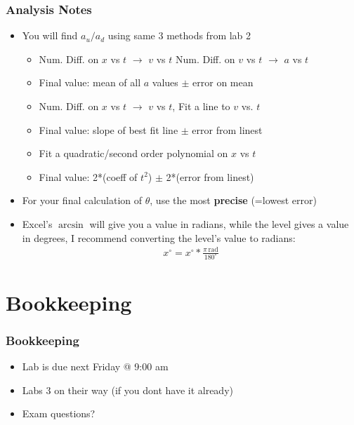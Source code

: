 \documentclass[aspectratio=169]{beamer}
\begin{document}
\begin{frame}
  \frametitle{Analysis Notes}
  \begin{itemize}
  \item You will find $a_u/a_d$ using same 3 methods from lab 2
    \begin{itemize}
    \item Num. Diff. on $x$ vs $t$ $\to$ $v$ vs $t$ Num. Diff. on $v$ vs $t$ $\to$ $a$ vs $t$
    \item Final value: mean of all $a$ values $\pm$ error on mean
    \item Num. Diff. on $x$ vs $t$ $\to$ $v$ vs $t$, Fit a line to $v$ vs. $t$
    \item Final value: slope of best fit line $\pm$ error from linest
    \item Fit a quadratic/second order polynomial on $x$ vs $t$
    \item Final value: 2*(coeff of $t^2$) $\pm$ 2*(error from linest)
    \end{itemize}
  \item For your final calculation of $\theta$, use the most \textbf{precise} \pause (=lowest error) \pause
  \item Excel's $\arcsin$ will give you a value in radians, while the level gives a value in degrees, I recommend converting the level's value to radians:
    \begin{align*}
      x^{\circ}=x^\circ*\frac{\pi\,\mathrm{rad}}{180^\circ}
    \end{align*}
  \end{itemize}
\end{frame}

\section{Bookkeeping}
\begin{frame}
  \frametitle{Bookkeeping}
  \begin{itemize}
  \item Lab is due next Friday @ 9:00 am
  \item Labs 3 on their way (if you dont have it already)
  \item Exam questions?
  \end{itemize}
\end{frame}
\end{document}
